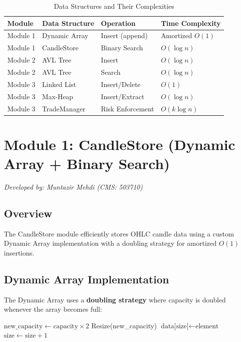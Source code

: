 \documentclass[12pt, a4paper]{article}
\begin{document}
\begin{table}[H]
\centering
\caption{Data Structures and Their Complexities}
\begin{tabular}{@{}llll@{}}
\toprule
\textbf{Module} & \textbf{Data Structure} & \textbf{Operation} & \textbf{Time Complexity} \\
\midrule
Module 1 & Dynamic Array & Insert (append) & Amortized $O(1)$ \\
Module 1 & CandleStore & Binary Search & $O(\log n)$ \\
Module 2 & AVL Tree & Insert & $O(\log n)$ \\
Module 2 & AVL Tree & Search & $O(\log n)$ \\
Module 3 & Linked List & Insert/Delete & $O(1)$ \\
Module 3 & Max-Heap & Insert/Extract & $O(\log n)$ \\
Module 3 & TradeManager & Risk Enforcement & $O(k \log n)$ \\
\bottomrule
\end{tabular}
\end{table}

\section{Module 1: CandleStore (Dynamic Array + Binary Search)}
\textit{Developed by: Muntazir Mehdi (CMS: 503710)}

\subsection{Overview}
The CandleStore module efficiently stores OHLC candle data using a custom Dynamic Array implementation with a doubling strategy for amortized $O(1)$ insertions.

\subsection{Dynamic Array Implementation}
The Dynamic Array uses a \textbf{doubling strategy} where capacity is doubled whenever the array becomes full:

\begin{algorithm}[H]
\caption{Dynamic Array Append}
\begin{algorithmic}[1]
        \State $\text{new\_capacity} \gets \text{capacity} \times 2$
        \State Resize(new\_capacity) 
    \EndIf
    \State $\text{data[size]} \gets \text{element}$
    \State $\text{size} \gets \text{size} + 1$
\EndProcedure
\end{algorithmic}
\end{algorithm}
\end{document}
